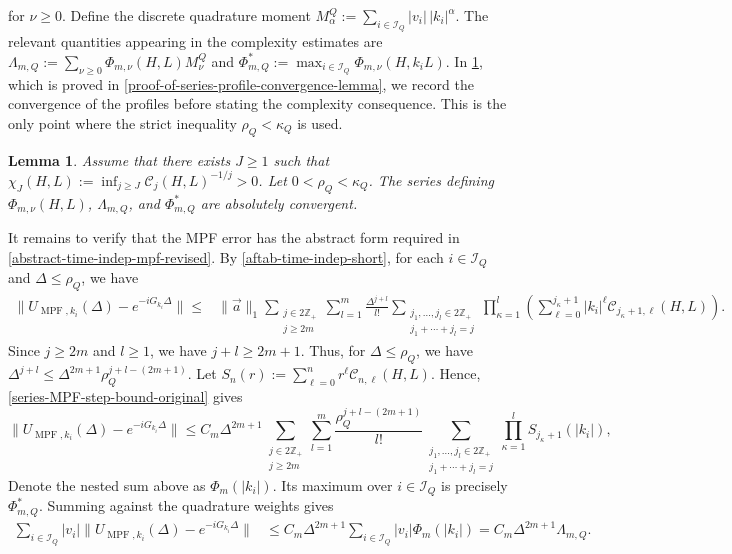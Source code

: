 \documentclass[10pt,reqno]{article}
\numberwithin{equation}{section}
\theoremstyle{plain}
\newtheorem{lem}[thm]{Lemma}
\theoremstyle{definition}
\begin{document}
for $\nu\geq 0$. Define the discrete quadrature moment \(M_\alpha^Q:=\sum_{i\in\mathcal I_Q}|v_i|\,|k_i|^\alpha\). The relevant quantities appearing in the complexity estimates are \(\Lambda_{m,Q}:=\sum_{\nu\geq 0}\Phi_{m,\nu}(H,L)M_\nu^Q\) and $\Phi^*_{m,Q} := \max_{i\in\mathcal I_Q} \Phi_{m,\nu}(H,k_iL)$. In \cref{series-profile-convergence-lemma}, which is proved in \cref{proof-of-series-profile-convergence-lemma}, we record the convergence of the profiles before stating the complexity consequence. This is the only point where the strict inequality \(\rho_Q<\kappa_Q\) is used.

\begin{lem}
\label{series-profile-convergence-lemma}
Assume that there exists \(J\geq 1\) such that $\chi_J(H,L):=\inf_{j\geq J}\mathcal C_j(H,L)^{-1/j}>0$.  Let \(0<\rho_Q<\kappa_Q\). The series defining \(\Phi_{m,\nu}(H,L)\), \(\Lambda_{m,Q}\), and \(\Phi^*_{m,Q}\) are absolutely convergent.
\end{lem}


It remains to verify that the MPF error has the abstract form required in \cref{abstract-time-indep-mpf-revised}. By \cref{aftab-time-indep-short}, for each \(i\in\mathcal I_Q\) and \(\Delta\leq\rho_Q\), we have
\begin{align}
\label{series-MPF-step-bound-original}
\| U_{\operatorname{MPF},k_i}(\Delta) - e^{-iG_{k_i}\Delta}\| \leq& \|\vec a\|_1 \sum_{\substack{j\in 2\mathbb Z_+\\ j\geq 2m}} \sum_{l=1}^{m} \frac{\Delta^{j+l}}{l!} \sum_{\substack{j_1,\dots,j_l\in 2\mathbb Z_+\\ j_1+\cdots+j_l=j}} \prod_{\kappa=1}^{l} \left( \sum_{\ell=0}^{j_\kappa+1} |k_i|^\ell \mathcal C_{j_\kappa+1,\ell}(H,L) \right).
\end{align}
Since \(j\geq 2m\) and \(l\geq 1\), we have $j+l\geq 2m+1$. Thus, for \(\Delta\leq \rho_Q\), we have $\Delta^{j+l} \leq \Delta^{2m+1}\rho_Q^{j+l-(2m+1)}$. Let $S_n(r):=\sum_{\ell=0}^{n}r^\ell\mathcal C_{n,\ell}(H,L)$. Hence, \cref{series-MPF-step-bound-original} gives
\begin{equation}
\label{series-MPF-step-bound-abstract}
\| U_{\operatorname{MPF},k_i}(\Delta) - e^{-iG_{k_i}\Delta} \| \leq C_m \Delta^{2m+1} \sum_{\substack{j\in 2\mathbb Z_+\\ j\geq 2m}} \sum_{l=1}^{m} \frac{\rho_Q^{j+l-(2m+1)}}{l!} \sum_{\substack{j_1,\dots,j_l\in 2\mathbb Z_+\\ j_1+\cdots+j_l=j}} \prod_{\kappa=1}^{l} S_{j_\kappa+1}(|k_i|) ,
\end{equation}
Denote the nested sum above as $\Phi_m(|k_i|)$. Its maximum over \(i\in\mathcal I_Q\) is precisely \(\Phi_{m,Q}^\ast\). Summing against the quadrature weights gives
\begin{align}
\label{series-weighted-MPF-bound}
\sum_{i\in\mathcal I_Q} |v_i|  \| U_{\operatorname{MPF},k_i}(\Delta) - e^{-iG_{k_i}\Delta} \| &\leq C_m \Delta^{2m+1} \sum_{i\in\mathcal I_Q}|v_i|\Phi_m(|k_i|) = C_m \Delta^{2m+1} \Lambda_{m,Q}.
\end{align}
\end{document}
